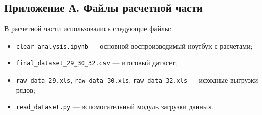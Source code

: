 \documentclass[12pt,a4paper]{article}
\begin{document}
\subsection*{Приложение А. Файлы расчетной части}
В расчетной части использовались следующие файлы:
\begin{itemize}
\item \texttt{clear\_analysis.ipynb} --- основной воспроизводимый ноутбук с расчетами;
\item \texttt{final\_dataset\_29\_30\_32.csv} --- итоговый датасет;
\item \texttt{raw\_data\_29.xls}, \texttt{raw\_data\_30.xls}, \texttt{raw\_data\_32.xls} ---
исходные выгрузки рядов;
\item \texttt{read\_dataset.py} --- вспомогательный модуль загрузки данных.
\end{itemize}
\end{document}
